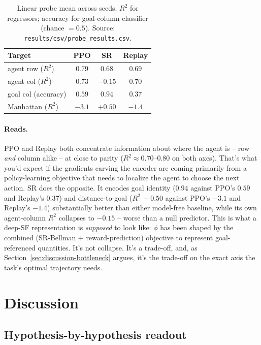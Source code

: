 \documentclass{article}
\begin{document}
\begin{table}[h]
\centering
\small
\caption{Linear probe mean across seeds. $R^2$ for regressors; accuracy for goal-column classifier (chance $=0.5$). Source: \texttt{results/csv/probe\_results.csv}.}
\label{tab:probe}
\begin{tabular}{@{}l c c c@{}}
\toprule
Target & PPO & SR & Replay \\
\midrule
agent row ($R^2$) & $0.79$ & $0.68$ & $0.69$ \\
agent col ($R^2$) & $0.73$ & $\mathbf{-0.15}$ & $0.70$ \\
goal col (accuracy) & $0.59$ & $\mathbf{0.94}$ & $0.37$ \\
Manhattan ($R^2$) & $-3.1$ & $\mathbf{+0.50}$ & $-1.4$ \\
\bottomrule
\end{tabular}
\end{table}

\paragraph{Reads.} PPO and Replay both concentrate information about where the agent is -- row \emph{and} column alike -- at close to parity ($R^2\approx 0.70$--$0.80$ on both axes). That's what you'd expect if the gradients carving the encoder are coming primarily from a policy-learning objective that needs to localize the agent to choose the next action. SR does the opposite. It encodes goal identity ($0.94$ against PPO's $0.59$ and Replay's $0.37$) and distance-to-goal ($R^2\,{+}0.50$ against PPO's $-3.1$ and Replay's $-1.4$) substantially better than either model-free baseline, while its own agent-column $R^2$ collapses to $-0.15$ -- worse than a null predictor. This is what a deep-SF representation is \emph{supposed} to look like: $\phi$ has been shaped by the combined (SR-Bellman + reward-prediction) objective to represent goal-referenced quantities. It's not collapse. It's a trade-off, and, as Section~\ref{sec:discussion-bottleneck} argues, it's the trade-off on the exact axis the task's optimal trajectory needs.

\section{Discussion}
\label{sec:discussion}

\subsection{Hypothesis-by-hypothesis readout}
\end{document}
